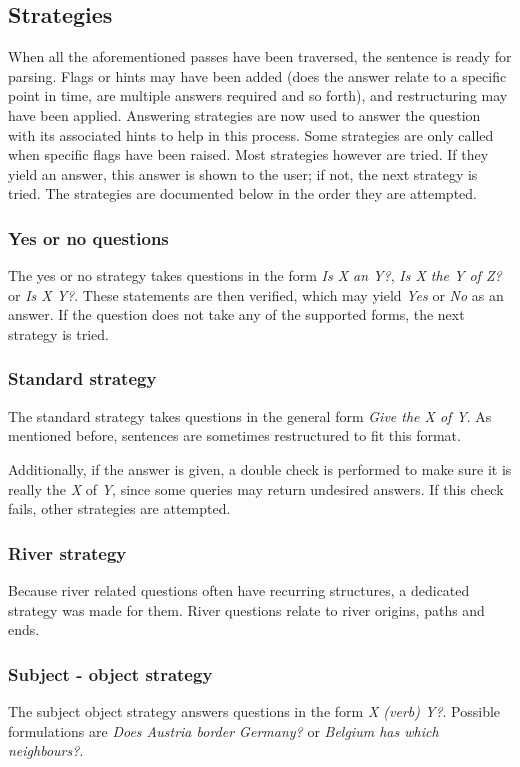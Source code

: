 \documentclass{article}
\begin{document}
\subsection{Strategies}
When all the aforementioned passes have been traversed, the sentence is ready for parsing. Flags or hints may have been added (does the answer relate to a specific point in time, are multiple answers required and so forth), and restructuring may have been applied. Answering strategies are now used to answer the question with its associated hints to help in this process. Some strategies are only called when specific flags have been raised. Most strategies however are tried. If they yield an answer, this answer is shown to the user; if not, the next strategy is tried. The strategies are documented below in the order they are attempted.

\subsubsection{Yes or no questions}
The yes or no strategy takes questions in the form \emph{Is X an Y?}, \emph{Is X the Y of Z?} or \emph{Is X Y?}. These statements are then verified, which may yield \emph{Yes} or \emph{No} as an answer. If the question does not take any of the supported forms, the next strategy is tried.

\subsubsection{Standard strategy}
The standard strategy takes questions in the general form \emph{Give the X of Y}. As mentioned before, sentences are sometimes restructured to fit this format.

Additionally, if the answer is given, a double check is performed to make sure it is really the \emph{X} of \emph{Y}, since some queries may return undesired answers. If this check fails, other strategies are attempted.

\subsubsection{River strategy}
Because river related questions often have recurring structures, a dedicated strategy was made for them. River questions relate to river origins, paths and ends.

\subsubsection{Subject - object strategy}
The subject object strategy answers questions in the form \emph{X (verb) Y?}. Possible formulations are \emph{Does Austria border Germany?} or \emph{Belgium has which neighbours?}.
\end{document}
